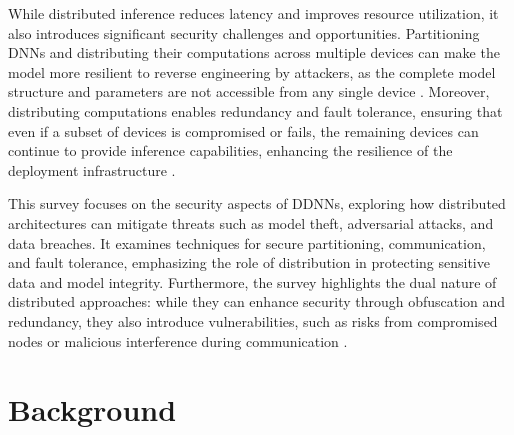 \documentclass[conference]{IEEEtran}
\begin{document}
While distributed inference reduces latency and improves resource utilization, it also introduces significant security challenges and opportunities. Partitioning DNNs and distributing their computations across multiple devices can make the model more resilient to reverse engineering by attackers, as the complete model structure and parameters are not accessible from any single device \cite{sahu2021denni}. Moreover, distributing computations enables redundancy and fault tolerance, ensuring that even if a subset of devices is compromised or fails, the remaining devices can continue to provide inference capabilities, enhancing the resilience of the deployment infrastructure \cite{ashouri2020analyzing}.

This survey focuses on the security aspects of DDNNs, exploring how distributed architectures can mitigate threats such as model theft, adversarial attacks, and data breaches. It examines techniques for secure partitioning, communication, and fault tolerance, emphasizing the role of distribution in protecting sensitive data and model integrity. Furthermore, the survey highlights the dual nature of distributed approaches: while they can enhance security through obfuscation and redundancy, they also introduce vulnerabilities, such as risks from compromised nodes or malicious interference during communication \cite{abdi2023efficient, teerapittayanon2017distributed}.





\section{Background}
\end{document}
